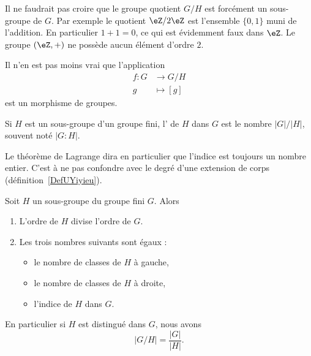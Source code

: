 \begin{example}      \label{EXooFNIKooHxePSs}
	Il ne faudrait pas croire que le groupe quotient \( G/H\) est forcément un sous-groupe de \( G\). Par exemple le quotient \( \eZ/2\eZ\) est l'ensemble \( \{ 0,1 \}\) muni de l'addition. En particulier \( 1+1=0\), ce qui est évidemment faux dans \( \eZ\). Le groupe \( (\eZ,+)\) ne possède aucun élément d'ordre \( 2\).

	Il n'en est pas moins vrai que l'application
	\begin{equation}
		\begin{aligned}
			f\colon G & \to G/H     \\
			g         & \mapsto [g]
		\end{aligned}
	\end{equation}
	est un morphisme de groupes.
\end{example}

\begin{definition}      \label{DEFooMPIAooIeZNaR}
	Si \( H\) est un sous-groupe d'un groupe fini, l' de \( H\) dans \( G\) est le nombre \( | G |/| H |\), souvent noté \( | G:H |\).
\end{definition}

Le théorème de Lagrange dira en particulier que l'indice est toujours un nombre entier. C'est à ne pas confondre avec le degré d'une extension de corps (définition~\ref{DefUYiyieu}).


\begin{theorem}   \label{ThoLagrange}
	Soit \( H\) un sous-groupe du groupe fini \( G\).  Alors
	\begin{enumerate}
		\item   \label{ITEMooDPKSooNpOusd}
		      L'ordre de \( H\) divise l'ordre de \( G\).
		\item
		      Les trois nombres suivants sont égaux :
		      \begin{itemize}
			      \item
			            le nombre de classes de \( H\) à gauche,
			      \item
			            le nombre de classes de \( H\) à droite,
			      \item
			            l'indice de \( H\) dans \( G\).
		      \end{itemize}
	\end{enumerate}
	En particulier si \( H\) est distingué dans \( G\), nous avons
	\begin{equation}
		| G/H |=\frac{ | G | }{ | H | }.
	\end{equation}
\end{theorem}

